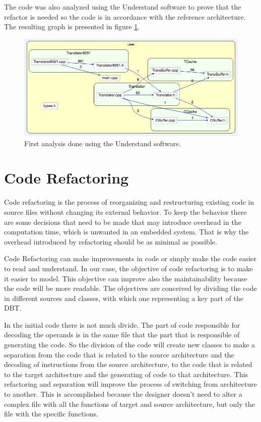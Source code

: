 \documentclass{report}
\begin{document}
	\par The code was also analyzed using the Understand software to prove that the refactor is needed so the code is in accordance with the reference architecture. The resulting graph is presented in figure \ref{fig:understand1}.
	
	\begin{figure} [H]
		\centering
		\includegraphics[width=0.6\linewidth]{Images/refactor1.jpg}
		\caption{First analysis done using the Understand software.}
		\label{fig:understand1}
	\end{figure}

	\section{Code Refactoring}
	Code refactoring is the process of reorganizing and restructuring existing code in source files without changing its external behavior. To keep the behavior there are some decisions that need to be made that may introduce overhead in the computation time, which is unwanted in an embedded system. That is why the overhead introduced by refactoring should be as minimal as possible.
	
	Code Refactoring can make improvements in code or simply make the code easier to read and understand.
	In our case, the objective of code refactoring is to make it easier to model. This objective can improve also the maintainability because the code will be more readable. The objectives are conceived by dividing the code in different sources and classes, with which one representing a key part of the DBT.
	
	In the initial code there is not much divide. The part of code responsible for decoding the operands is in the same file that the part that is responsible of generating the code. So the division of the code will create new classes to make a separation from the code that is related to the source architecture and the decoding of instructions from the source architecture, to the code that is related to the target architecture and the generating of code to that architecture.
	This refactoring and separation will improve the process of switching from architecture to another. This is accomplished because the designer doesn't need to alter a complex file with all the functions of target and source architecture, but only the file with the specific functions. 
	
\end{document}
